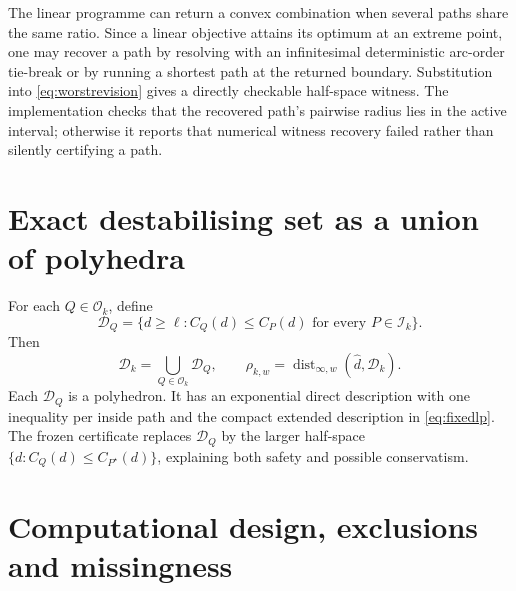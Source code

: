 \documentclass[11pt]{article}
\theoremstyle{definition}
\newcommand{\cI}{\mathcal{I}}
\newcommand{\cO}{\mathcal{O}}
\newcommand{\dhat}{\widehat d}
\newcommand{\ellv}{\ell}
\begin{document}
The linear programme can return a convex combination when several paths share the same ratio. Since a linear objective attains its optimum at an extreme point, one may recover a path by resolving with an infinitesimal deterministic arc-order tie-break or by running a shortest path at the returned boundary. Substitution into \eqref{eq:worstrevision} gives a directly checkable half-space witness. The implementation checks that the recovered path's pairwise radius lies in the active interval; otherwise it reports that numerical witness recovery failed rather than silently certifying a path.

\section{Exact destabilising set as a union of polyhedra}

For each $Q\in\cO_k$, define
\[
\mathcal D_Q=\{d\ge\ellv:C_Q(d)\le C_P(d)\text{ for every }P\in\cI_k\}.
\]
Then
\[
\mathcal D_k=\bigcup_{Q\in\cO_k}\mathcal D_Q,
\qquad
\rho_{k,w}=\operatorname{dist}_{\infty,w}(\dhat,\mathcal D_k).
\]
Each $\mathcal D_Q$ is a polyhedron. It has an exponential direct description with one inequality per inside path and the compact extended description in \eqref{eq:fixedlp}. The frozen certificate replaces $\mathcal D_Q$ by the larger half-space $\{d:C_Q(d)\le C_{P^\star}(d)\}$, explaining both safety and possible conservatism.

\section{Computational design, exclusions and missingness}\label{app:compute}
\end{document}
